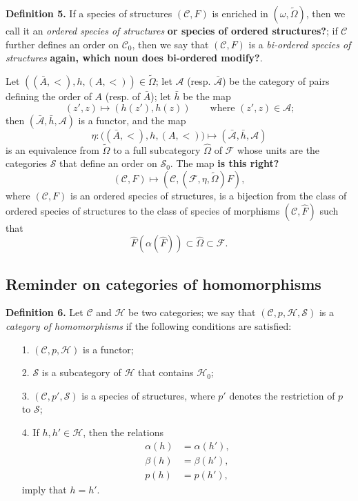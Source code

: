 \documentclass[fleqn]{article}
\newenvironment{rmenv}[1]
  {\phantomsection\par\medskip\noindent\textbf{#1.}\rmfamily}
  {\par\medskip}
\newcommand{\oldpage}[1]{\marginpar{\footnotesize$\Big\vert$ \textit{p.~#1}}}
\newcommand{\unsure}[1]{{\color{purple}\textbf{#1}}}
\newcommand{\CC}{\mathcal{C}}
\newcommand{\HH}{\mathcal{H}}
\renewcommand{\SS}{\mathcal{S}}
\newcommand{\FF}{\mathcal{F}}
\renewcommand{\AA}{\mathcal{A}}
\begin{document}
\begin{rmenv}{Definition 5}
  If a species of structures $(\CC,F)$ is enriched in $(\omega,\widetilde{\Omega})$, then we call it an \emph{ordered species of structures} \unsure{or species of ordered structures?};
  if $\CC$ further defines an order on $\CC_0$, then we say that $(\CC,F)$ is a \emph{bi-ordered species of structures} \unsure{again, which noun does bi-ordered modify?}.
\end{rmenv}

Let $((\bar{A},<),h,(A,<))\in\widetilde{\Omega}$;
let $\AA$ (resp. $\bar{\AA}$) be the category of pairs defining the order of $A$ (resp. of $\bar{A}$);
let $\bar{h}$ be the map
\[
  (z',z)
  \longmapsto(h(z'),h(z))
  \qquad\text{where $(z',z)\in\AA$;}
\]
then $(\bar{\AA},\bar{h},\AA)$ is a functor, and the map
\[
  \eta\colon\big((\bar{A},<),h,(A,<)\big)
  \longmapsto(\bar{\AA},\bar{h},\AA)
\]
is an equivalence from $\widetilde{\Omega}$ to a full subcategory $\widehat{\Omega}$ of $\FF$ whose units are the categories $\SS$ that define an order on $\SS_0$.
The map \unsure{is this right?}
\[
  (\CC,F)
  \longmapsto (\CC,(\FF,\eta,\widetilde{\Omega})F),
\]
where $(\CC,F)$ is an ordered species of structures, is a bijection from the class of ordered species of structures to the class of species of morphisms $(\CC,\widehat{F})$ such that
\[
  \widehat{F}(\alpha(\widehat{F}))
  \subset \widehat{\Omega}
  \subset \FF.
\]



\subsection{Reminder on categories of homomorphisms}
\label{section:i.4}

\begin{rmenv}{Definition 6}
  Let $\CC$ and $\HH$ be two categories;
  we say \cite{3a} that $(\CC,p,\HH,\SS)$ is a \emph{category of homomorphisms} if the following conditions are satisfied:
  \begin{enumerate}
    \item[1.]
      $(\CC,p,\HH)$ is a functor;
    \item[2.]
      \oldpage{357}
      $\SS$ is a subcategory of $\HH$ that contains $\HH_0$;
    \item[3.]
      $(\CC,p',\SS)$ is a species of structures, where $p'$ denotes the restriction of $p$ to $\SS$;
    \item[4.]
      If $h,h'\in\HH$, then the relations
      \[
        \begin{aligned}
          \alpha(h)
          &= \alpha(h'),
        \\\beta(h)
          &= \beta(h'),
        \\p(h)
          &= p(h'),
        \end{aligned}
      \]
      imply that $h=h'$.
  \end{enumerate}
\end{rmenv}
\end{document}
